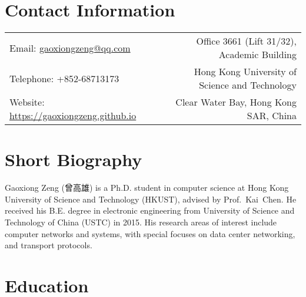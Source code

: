 \documentclass[10pt,a4paper,roman]{moderncv} %
\begin{document}
\makecvtitle %

\section{Contact Information}
\vspace{2mm}
\begin{tabular}{p{} r}
Email: \href{mailto:gaoxiongzeng@qq.com}{gaoxiongzeng@qq.com} &  Office 3661 (Lift 31/32), Academic Building\\
Telephone: +852-68713173 & Hong Kong University of Science and Technology\\
Website: \textcolor{blue}{\url{https://gaoxiongzeng.github.io}} & Clear Water Bay, Hong Kong SAR, China\\
\end{tabular}


\section{Short Biography}
\vspace{2mm}
Gaoxiong Zeng (曾高雄) is a Ph.D. student in computer science at Hong Kong University of Science and Technology (HKUST), advised by Prof.~Kai~Chen. He received his B.E. degree in electronic engineering from University of Science and Technology of China (USTC) in 2015. His research areas of interest include computer networks and systems, with special focuses on data center networking, and transport protocols.

\section{Education}
\vspace{2mm}
\vspace{2mm}
\end{document}
